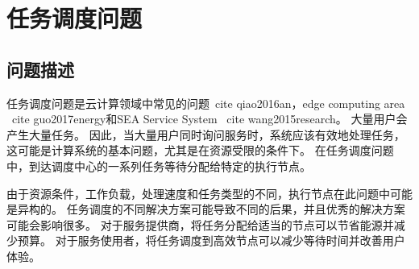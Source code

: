 \section{任务调度问题}
\subsection{问题描述}

任务调度问题是云计算领域中常见的问题\ cite {qiao2016an}，edge computing area \ cite {guo2017energy}和SEA Service System \ cite {wang2015research}。 大量用户会产生大量任务。 因此，当大量用户同时询问服务时，系统应该有效地处理任务，这可能是计算系统的基本问题，尤其是在资源受限的条件下。 在任务调度问题中，到达调度中心的一系列任务等待分配给特定的执行节点。

由于资源条件，工作负载，处理速度和任务类型的不同，执行节点在此问题中可能是异构的。 任务调度的不同解决方案可能导致不同的后果，并且优秀的解决方案可能会影响很多。 对于服务提供商，将任务分配给适当的节点可以节省能源并减少预算。 对于服务使用者，将任务调度到高效节点可以减少等待时间并改善用户体验。

